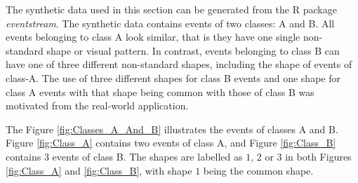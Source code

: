 \documentclass[a4paper,11pt]{article}
\begin{document}
The synthetic data used in this section can be generated from the R package \textit{eventstream}. The synthetic data contains events of two classes: A and B. All events belonging to class A look similar, that is they have one single non-standard shape or visual pattern. In contrast, events belonging to class B can have one of three different non-standard shapes, including the shape of events of class-A. The use of three different shapes for class B events and one shape for class A events with that shape being common with those of class B was motivated from the real-world application.

The Figure \ref{fig:Classes_A_And_B} illustrates the events of classes A and B. Figure \ref{fig:Class_A} contains two events of class A, and Figure \ref{fig:Class_B} contains 3 events of class B. The shapes are labelled as $1$, $2$ or $3$ in both Figures \ref{fig:Class_A} and \ref{fig:Class_B}, with shape $1$ being the common shape.

\end{document}
